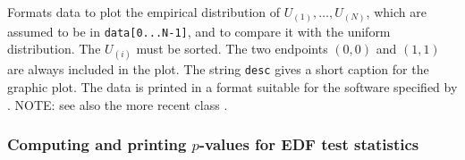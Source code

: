  \begin{tabb}  Formats data to plot the empirical distribution of
  $U_{(1)},\dots,U_{(N)}$, which are assumed to be in \texttt{data[0...N-1]},
  and to compare it with the uniform distribution. The $U_{(i)}$ must be sorted.
  The two endpoints $(0, 0)$ and $(1, 1)$ are always included in the plot.
  The string \texttt{desc} gives a short caption for the graphic plot.
  The data is printed in a format suitable for the
  software specified by .
   NOTE: see also the more recent class
  .
 \end{tabb}
\begin{htmlonly}
\end{htmlonly}
\begin{code}
\end{code}

\subsubsection*{Computing and printing $p$-values for EDF test statistics}

